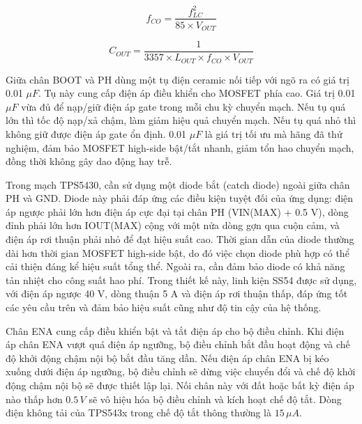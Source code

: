 \begin{equation}
f_{CO} = \frac{f_{LC}^2}{85 \times V_{OUT}}
\end{equation}

\begin{equation}
C_{OUT} = \frac{1}{3357 \times L_{OUT} \times f_{CO} \times V_{OUT}}
\end{equation} 

Giữa chân BOOT và PH dùng một tụ điện ceramic nối tiếp với ngõ ra có giá trị 0.01 $\mu F$. Tụ này cung cấp điện áp điều khiển cho MOSFET phía cao. Giá trị 0.01 $\mu F$ vừa đủ để nạp/giữ điện áp gate trong mỗi chu kỳ chuyển mạch. Nếu tụ quá lớn thì tốc độ nạp/xả chậm, làm giảm hiệu quả chuyển mạch. Nếu tụ quá nhỏ thì không giữ được điện áp gate ổn định. 0.01 $\mu F$ là giá trị tối ưu mà hãng đã thử nghiệm, đảm bảo MOSFET high-side bật/tắt nhanh, giảm tổn hao chuyển mạch, đồng thời không gây dao động hay trễ.

Trong mạch TPS5430, cần sử dụng một diode bắt (catch diode) ngoài giữa chân PH và GND. Diode này phải đáp ứng các điều kiện tuyệt đối của ứng dụng: điện áp ngược phải lớn hơn điện áp cực đại tại chân PH (VIN(MAX) + 0.5 V), dòng đỉnh phải lớn hơn IOUT(MAX) cộng với một nửa dòng gợn qua cuộn cảm, và điện áp rơi thuận phải nhỏ để đạt hiệu suất cao. Thời gian dẫn của diode thường dài hơn thời gian MOSFET high-side bật, do đó việc chọn diode phù hợp có thể cải thiện đáng kể hiệu suất tổng thể. Ngoài ra, cần đảm bảo diode có khả năng tản nhiệt cho công suất hao phí. Trong thiết kế này, linh kiện SS54 được sử dụng, với điện áp ngược 40 V, dòng thuận 5 A và điện áp rơi thuận thấp, đáp ứng tốt các yêu cầu trên và đảm bảo hiệu suất cũng như độ tin cậy của hệ thống.

Chân ENA cung cấp điều khiển bật và tắt điện áp cho bộ điều chỉnh. Khi điện áp chân ENA vượt quá điện áp ngưỡng, bộ điều chỉnh bắt đầu hoạt động và chế độ khởi động chậm nội bộ bắt đầu tăng dần. Nếu điện áp chân ENA bị kéo xuống dưới điện áp ngưỡng, bộ điều chỉnh sẽ dừng việc chuyển đổi và chế độ khởi động chậm nội bộ sẽ được thiết lập lại. Nối chân này với đất hoặc bất kỳ điện áp nào thấp hơn \(0.5\,V\) sẽ vô hiệu hóa bộ điều chỉnh và kích hoạt chế độ tắt. Dòng điện không tải của TPS543x trong chế độ tắt thông thường là \(15\,\mu A\).

